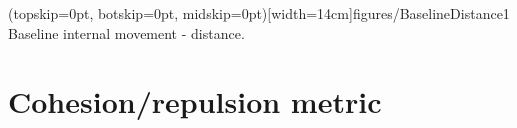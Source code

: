 \documentclass{ieeeaccess}
\begin{document}
\Figure[t!](topskip=0pt, botskip=0pt, midskip=0pt)[width=14cm]{figures/BaselineDistance1}
{Baseline internal movement - distance.\label{coord:BaselineDistance1}}


\section{Cohesion/repulsion metric}\label{Section:MagnitudeDynamics}


\end{document}
